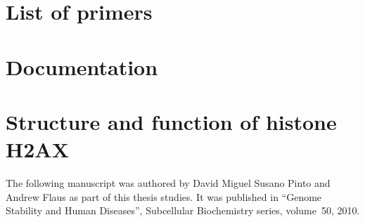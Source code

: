 \chapter{List of primers}
  \label{app:primers}

\chapter{Documentation}
  \label{app:pod-doc}
  

\chapter{Structure and function of histone H2AX}
  \label{app:h2ax-review}

  The following manuscript was authored by David Miguel Susano Pinto and
  Andrew Flaus as part of this thesis studies. It was published in ``Genome
  Stability and Human Diseases'', Subcellular Biochemistry series, volume~50,
  2010.

  
